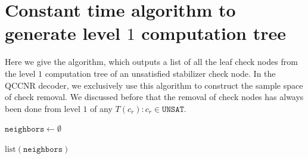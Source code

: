 \documentclass[%
 reprint,
 amsmath,amssymb,
 aps,
pra,
showkeys,
]{revtex4-2}
\begin{document}
\section{Constant time algorithm to generate level $1$ computation tree}
Here we give the algorithm, which outputs a list of all the leaf check nodes from the level $1$ computation tree of an unsatisfied stabilizer check node.
In the QCCNR decoder, we exclusively use this algorithm to construct the sample space of check removal.
We discussed before that the removal of check nodes has always been done from level $1$ of any $T(c_r) : c_r \in \mathtt{UNSAT}$.
\begin{algorithm}
\caption{Layer1\_CT}\label{alg:layer1_tree}


$\mathtt{neighbors} \gets \emptyset$

\BlankLine


\BlankLine
\Return $\text{list}(\mathtt{neighbors})$

\end{algorithm}
\end{document}
